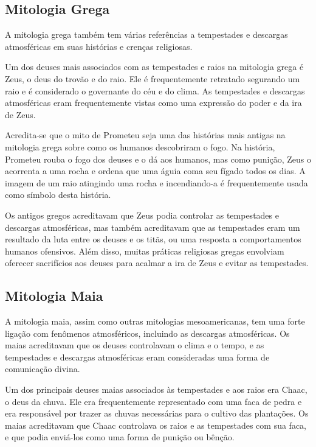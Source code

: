 \documentclass[a4paper, 12pt, onecolumn,singlespacing]{article}
\begin{document}
	\subsection{Mitologia Grega}
	
	A mitologia grega também tem várias referências a tempestades e descargas atmosféricas em suas histórias e crenças religiosas.
	
	Um dos deuses mais associados com as tempestades e raios na mitologia grega é Zeus, o deus do trovão e do raio. Ele é frequentemente retratado segurando um raio e é considerado o governante do céu e do clima. As tempestades e descargas atmosféricas eram frequentemente vistas como uma expressão do poder e da ira de Zeus.
	
	Acredita-se que o mito de Prometeu seja uma das histórias mais antigas na mitologia grega sobre como os humanos descobriram o fogo. Na história, Prometeu rouba o fogo dos deuses e o dá aos humanos, mas como punição, Zeus o acorrenta a uma rocha e ordena que uma águia coma seu fígado todos os dias. A imagem de um raio atingindo uma rocha e incendiando-a é frequentemente usada como símbolo desta história.
	
	Os antigos gregos acreditavam que Zeus podia controlar as tempestades e descargas atmosféricas, mas também acreditavam que as tempestades eram um resultado da luta entre os deuses e os titãs, ou uma resposta a comportamentos humanos ofensivos. Além disso, muitas práticas religiosas gregas envolviam oferecer sacrifícios aos deuses para acalmar a ira de Zeus e evitar as tempestades.
	
	\subsection{Mitologia Maia}
	
	A mitologia maia, assim como outras mitologias mesoamericanas, tem uma forte ligação com fenômenos atmosféricos, incluindo as descargas atmosféricas. Os maias acreditavam que os deuses controlavam o clima e o tempo, e as tempestades e descargas atmosféricas eram consideradas uma forma de comunicação divina.
	
	Um dos principais deuses maias associados às tempestades e aos raios era Chaac, o deus da chuva. Ele era frequentemente representado com uma faca de pedra e era responsável por trazer as chuvas necessárias para o cultivo das plantações. Os maias acreditavam que Chaac controlava os raios e as tempestades com sua faca, e que podia enviá-los como uma forma de punição ou bênção.
	
\end{document}

